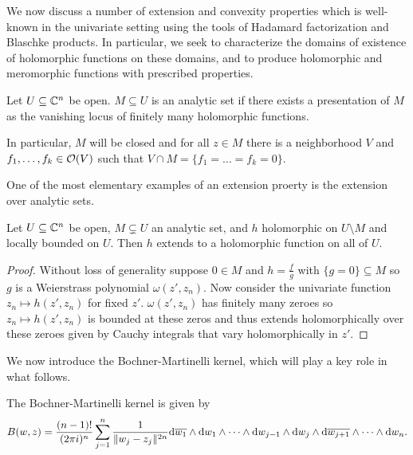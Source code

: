We now discuss a number of extension and convexity properties which is well-known in the univariate setting using the tools of Hadamard factorization and Blaschke products. In particular, we seek to characterize the domains of existence of holomorphic functions on these domains, and to produce holomorphic and meromorphic functions with prescribed properties. 

\begin{definition}\label{def: analytic set}
    Let $U\subseteq\mathbb{C}^{n}$ be open. $M\subseteq U$ is an analytic set if there exists a presentation of $M$ as the vanishing locus of finitely many holomorphic functions. 
\end{definition}
\begin{remark}
    In particular, $M$ will be closed and for all $z\in M$ there is a neighborhood $V$ and $f_{1},\dots,f_{k}\in\mathcal{O}(V)$ such that $V\cap M=\{f_{1}=\dots=f_{k}=0\}$. 
\end{remark}
One of the most elementary examples of an extension proerty is the extension over analytic sets. 
\begin{theorem}\label{thm: first Riemann extension}
    Let $U\subseteq\mathbb{C}^{n}$ be open, $M\subsetneq U$ an analytic set, and $h$ holomorphic on $U\setminus M$ and locally bounded on $U$. Then $h$ extends to a holomorphic function on all of $U$.
\end{theorem}
\begin{proof}
    Without loss of generality suppose $0\in M$ and $h=\frac{f}{g}$ with $\{g=0\}\subseteq M$ so $g$ is a Weierstrass polynomial $\omega(z',z_{n})$. Now consider the univariate function $z_{n}\mapsto h(z',z_{n})$ for fixed $z'$. $\omega(z',z_{n})$ has finitely many zeroes so $z_{n}\mapsto h(z',z_{n})$ is bounded at these zeros and thus extends holomorphically over these zeroes given by Cauchy integrals that vary holomorphically in $z'$.  
\end{proof}
We now introduce the Bochner-Martinelli kernel, which will play a key role in what follows. 
\begin{definition}\label{def: Bochner-Martinelli kernel}
    The Bochner-Martinelli kernel is given by 
    $$B(w,z)=\frac{(n-1)!}{(2\pi i)^{n}}\sum_{j=1}^{n}\frac{1}{\Vert w_{j}-z_{j}\Vert^{2n}}\mathrm{d}\overline{w_{1}}\wedge\mathrm{d} w_{1}\wedge\dots\wedge\mathrm{d} w_{j-1}\wedge\mathrm{d} w_{j}\wedge \mathrm{d}\overline{w_{j+1}}\wedge\dots\wedge\mathrm{d} w_{n}.$$
\end{definition}
